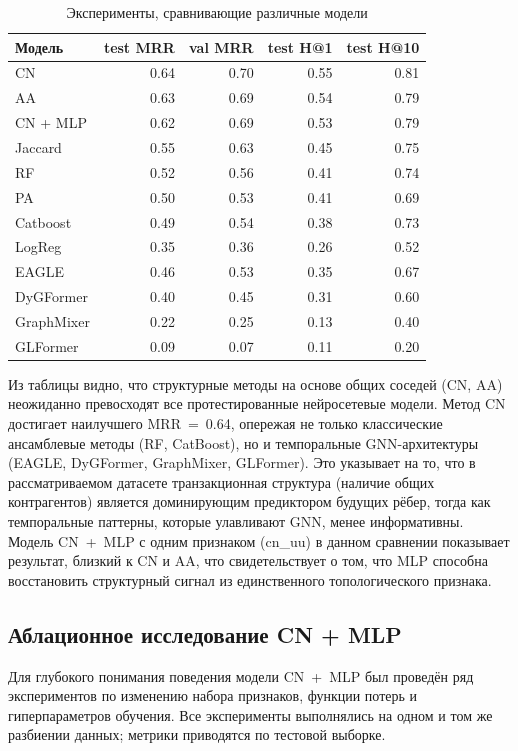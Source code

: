 \documentclass[a4paper,12pt]{extarticle}
\begin{document}
\begin{table}[ht]
	\caption{Эксперименты, сравнивающие различные модели}
	\label{table:long_epochs}
	\footnotesize
	\centering
	\begin{tabular}{lrrrr}
		\toprule
		Модель & test MRR & val MRR & test H@1 & test H@10\\
		\midrule
		CN & 0.64 & 0.70 & 0.55 & 0.81\\
		AA & 0.63 & 0.69 & 0.54 & 0.79\\
		CN + MLP & 0.62 & 0.69 & 0.53 & 0.79\\
		Jaccard & 0.55 & 0.63 & 0.45 & 0.75\\
		RF & 0.52 & 0.56 & 0.41 & 0.74\\
		PA & 0.50 & 0.53 & 0.41 & 0.69\\
		Catboost & 0.49 & 0.54 & 0.38 & 0.73\\
		LogReg & 0.35 & 0.36 & 0.26 & 0.52\\
		\bottomrule
		EAGLE & 0.46 & 0.53 & 0.35 & 0.67\\
		DyGFormer & 0.40 & 0.45 & 0.31 & 0.60\\
		GraphMixer & 0.22 & 0.25 & 0.13 & 0.40\\
		GLFormer & 0.09 & 0.07 & 0.11 & 0.20\\
	\end{tabular}
\end{table}

Из таблицы видно, что структурные методы на основе общих соседей (CN, AA) неожиданно превосходят все протестированные нейросетевые модели. Метод CN достигает наилучшего MRR~=~0.64, опережая не только классические ансамблевые методы (RF, CatBoost), но и темпоральные GNN-архитектуры (EAGLE, DyGFormer, GraphMixer, GLFormer). Это указывает на то, что в рассматриваемом датасете транзакционная структура (наличие общих контрагентов) является доминирующим предиктором будущих рёбер, тогда как темпоральные паттерны, которые улавливают GNN, менее информативны. Модель CN~+~MLP с одним признаком (cn\_uu) в данном сравнении показывает результат, близкий к CN и AA, что свидетельствует о том, что MLP способна восстановить структурный сигнал из единственного топологического признака.

\subsection{Аблационное исследование CN + MLP}

Для глубокого понимания поведения модели CN~+~MLP был проведён ряд экспериментов по изменению набора признаков, функции потерь и гиперпараметров обучения. Все эксперименты выполнялись на одном и том же разбиении данных; метрики приводятся по тестовой выборке.
\end{document}
